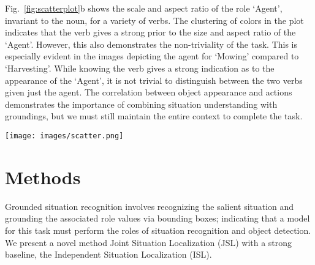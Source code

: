 \documentclass[runningheads]{llncs}
\begin{document}
Fig.~\ref{fig:scatterplot}b shows the scale and aspect ratio of the role `Agent', invariant to the noun, for a variety of verbs. The clustering of colors in the plot indicates that the verb gives a strong prior to the size and aspect ratio of the `Agent'. However, this also demonstrates the non-triviality of the task. This is especially evident in the images depicting the agent for `Mowing' compared to `Harvesting'. While knowing the verb gives a strong indication as to the appearance of the `Agent', it is not trivial to distinguish between the two verbs given just the agent. The correlation between object appearance and actions demonstrates the importance of combining situation understanding with groundings, but we must still maintain the entire context to complete the task.  

\vspace{-5mm}
\begin{figure*}[h!]
\begin{center}
\texttt{[image: images/scatter.png]}
\end{center}
\vspace{-5mm}
\caption{\textbf{Scale and aspect ratio distributions across nouns and roles.} (A) Every occurrence of the noun `Rope' for verbs - showing that verb gives a strong prior towards the physical attributes of an object. (B) The role `Agent', invariant to the noun - shows priors but also the challenges of the task}
\label{fig:scatterplot}
\vspace{-5mm}
\end{figure*}






 \vspace{-5mm}
\section{Methods}
\label{sec:methods}
\vspace{-2mm}

Grounded situation recognition involves recognizing the salient situation and grounding the associated role values via bounding boxes; indicating that a model for this task must perform the roles of situation recognition and object detection. We present a novel method Joint Situation Localization (JSL) with a strong baseline, the Independent Situation Localization (ISL). 

\vspace{-5mm}
\end{document}
